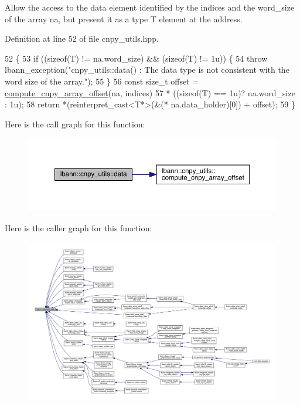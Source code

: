 Allow the access to the data element identified by the indices and the word\+\_\+size of the array na, but present it as a type T element at the address. 

Definition at line 52 of file cnpy\+\_\+utils.\+hpp.


\begin{DoxyCode}
52                                                                         \{
53   \textcolor{keywordflow}{if} ((\textcolor{keyword}{sizeof}(T) != na.word\_size) && (\textcolor{keyword}{sizeof}(T) != 1u)) \{
54     \textcolor{keywordflow}{throw} lbann\_exception(\textcolor{stringliteral}{"cnpy\_utils::data() : The data type is not consistent with the word size of the
       array."});
55   \}
56   \textcolor{keyword}{const} \textcolor{keywordtype}{size\_t} offset = \hyperlink{namespacelbann_1_1cnpy__utils_a39fd207d94d1333e6379c53423b6f1a1}{compute\_cnpy\_array\_offset}(na, indices)
57                         * ((\textcolor{keyword}{sizeof}(T) == 1u)? na.word\_size : 1u);
58   \textcolor{keywordflow}{return} *(\textcolor{keyword}{reinterpret\_cast<}T*\textcolor{keyword}{>}(&(* na.data\_holder)[0]) + offset);
59 \}
\end{DoxyCode}
Here is the call graph for this function\+:\nopagebreak
\begin{figure}[H]
\begin{center}
\leavevmode
\includegraphics[width=350pt]{namespacelbann_1_1cnpy__utils_a9ac86d96ccb1f8b4b2ea16441738781f_cgraph}
\end{center}
\end{figure}
Here is the caller graph for this function\+:\nopagebreak
\begin{figure}[H]
\begin{center}
\leavevmode
\includegraphics[width=350pt]{namespacelbann_1_1cnpy__utils_a9ac86d96ccb1f8b4b2ea16441738781f_icgraph}
\end{center}
\end{figure}
